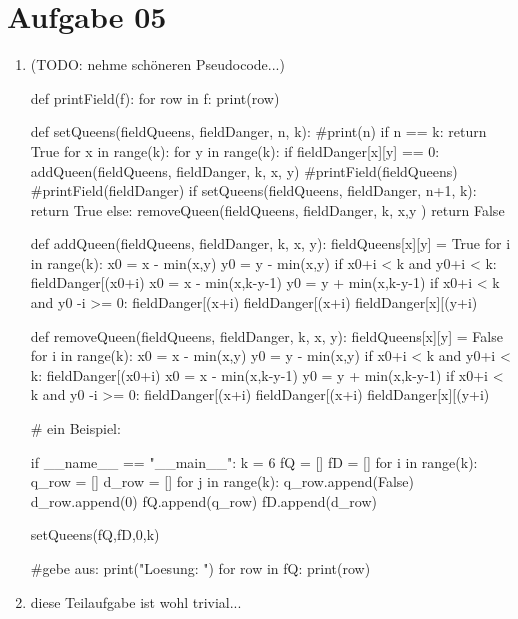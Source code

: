 \documentclass[10pt,a4paper]{article}
\begin{document}
\section*{Aufgabe 05}
    \begin{enumerate}[label={\alph*)}]
        \item (TODO: nehme sch\"oneren Pseudocode...)
            \begin{python}[frame=single]
def printField(f):
    for row in f:
        print(row)

def setQueens(fieldQueens, fieldDanger, n, k):
    #print(n)
    if n == k:
        return True
    for x in range(k):
        for y in range(k):
            if fieldDanger[x][y] == 0:
                addQueen(fieldQueens, fieldDanger, k, x, y)
                #printField(fieldQueens)
                #printField(fieldDanger)
                if setQueens(fieldQueens, fieldDanger, n+1, k):
                    return True
                else:
                    removeQueen(fieldQueens, fieldDanger, k, x,y )
    return False

def addQueen(fieldQueens, fieldDanger, k, x, y):
    fieldQueens[x][y] = True
    for i in range(k):
        x0 = x - min(x,y)
        y0 = y - min(x,y)
        if x0+i < k and y0+i < k:
            fieldDanger[(x0+i) %
        x0 = x - min(x,k-y-1)
        y0 = y + min(x,k-y-1)
        if x0+i < k and y0 -i >= 0:
            fieldDanger[(x+i)%
        fieldDanger[(x+i)%
        fieldDanger[x][(y+i)%

def removeQueen(fieldQueens, fieldDanger, k, x, y):
    fieldQueens[x][y] = False
    for i in range(k):
        x0 = x - min(x,y)
        y0 = y - min(x,y)
        if x0+i < k and y0+i < k:
            fieldDanger[(x0+i) %
        x0 = x - min(x,k-y-1)
        y0 = y + min(x,k-y-1)
        if x0+i < k and y0 -i >= 0:
            fieldDanger[(x+i)%
        fieldDanger[(x+i)%
        fieldDanger[x][(y+i)%

# ein Beispiel:

if __name__ == "__main__":
    k = 6
    fQ = []
    fD = []
    for i in range(k):
        q_row = []
        d_row = []
        for j in range(k):
            q_row.append(False)
            d_row.append(0)
        fQ.append(q_row)
        fD.append(d_row)

    setQueens(fQ,fD,0,k)

    #gebe aus:
    print("Loesung: ")
    for row in fQ:
        print(row)
            \end{python}

            \item diese Teilaufgabe ist wohl trivial...

    \end{enumerate}
\end{document}
